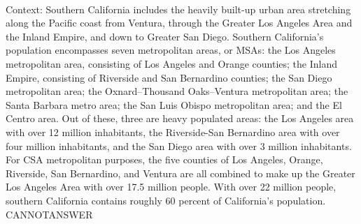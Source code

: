 \documentclass[11pt,a4paper, onecolumn]{article}
\begin{document}
\\ Context: Southern California includes the heavily built-up urban area stretching along the Pacific coast from Ventura, through the Greater Los Angeles Area and the Inland Empire, and down to Greater San Diego. Southern California's population encompasses seven metropolitan areas, or MSAs: the Los Angeles metropolitan area, consisting of Los Angeles and Orange counties; the Inland Empire, consisting of Riverside and San Bernardino counties; the San Diego metropolitan area; the Oxnard–Thousand Oaks–Ventura metropolitan area; the Santa Barbara metro area; the San Luis Obispo metropolitan area; and the El Centro area. Out of these, three are heavy populated areas: the Los Angeles area with over 12 million inhabitants, the Riverside-San Bernardino area with over four million inhabitants, and the San Diego area with over 3 million inhabitants. For CSA metropolitan purposes, the five counties of Los Angeles, Orange, Riverside, San Bernardino, and Ventura are all combined to make up the Greater Los Angeles Area with over 17.5 million people. With over 22 million people, southern California contains roughly 60 percent of California's population. CANNOTANSWER
\end{document}
